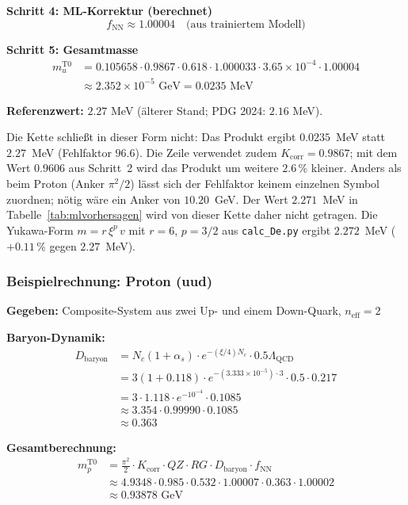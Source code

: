 	\textbf{Schritt 4: ML-Korrektur (berechnet)}
	\begin{equation}
		f_{\text{NN}} \approx 1.00004 \quad \text{(aus trainiertem Modell)}
	\end{equation}
	
	\textbf{Schritt 5: Gesamtmasse}
	\begin{align}
		m_u^{\text{T0}} &= 0.105658 \cdot 0.9867 \cdot 0.618 \cdot 1.000033 \cdot 3.65 \times 10^{-4} \cdot 1.00004 \\
				&\approx 2.352 \times 10^{-5} \text{ GeV} = 0.0235 \text{ MeV}
	\end{align}

	\textbf{Referenzwert:} $2.27$ MeV (älterer Stand; PDG 2024: $2.16$ MeV).

	Die Kette schließt in dieser Form nicht: Das Produkt ergibt $0.0235$~MeV statt $2.27$~MeV (Fehlfaktor $96.6$). Die Zeile verwendet zudem $K_{\text{corr}} = 0.9867$; mit dem Wert $0.9606$ aus Schritt~2 wird das Produkt um weitere $2.6\,\%$ kleiner. Anders als beim Proton (Anker $\pi^2/2$) lässt sich der Fehlfaktor keinem einzelnen Symbol zuordnen; nötig wäre ein Anker von $10.20$~GeV. Der Wert $2.271$~MeV in Tabelle~\ref{tab:mlvorhersagen} wird von dieser Kette daher nicht getragen. Die Yukawa-Form $m = r\,\xi^p\,v$ mit $r = 6$, $p = 3/2$ aus \texttt{calc\_De.py} ergibt $2.272$~MeV ($+0.11\,\%$ gegen $2.27$~MeV).
	
	\subsubsection{Beispielrechnung: Proton (uud)}
	
	\textbf{Gegeben:} Composite-System aus zwei Up- und einem Down-Quark, $n_{\text{eff}}=2$
	
	\textbf{Baryon-Dynamik:}
	\begin{align}
		D_{\text{baryon}} &= N_c (1 + \alpha_s) \cdot e^{-(\xi/4) N_c} \cdot 0.5 \Lambda_{\text{QCD}} \\
		&= 3 (1 + 0.118) \cdot e^{-(3.333 \times 10^{-5}) \cdot 3} \cdot 0.5 \cdot 0.217 \\
		&= 3 \cdot 1.118 \cdot e^{-10^{-4}} \cdot 0.1085 \\
		&\approx 3.354 \cdot 0.99990 \cdot 0.1085 \\
		&\approx 0.363
	\end{align}
	
	\textbf{Gesamtberechnung:}
	\begin{align}
		m_p^{\text{T0}} &= \frac{\pi^2}{2} \cdot K_{\text{corr}} \cdot QZ \cdot RG \cdot D_{\text{baryon}} \cdot f_{\text{NN}} \\
		&\approx 4.9348 \cdot 0.985 \cdot 0.532 \cdot 1.00007 \cdot 0.363 \cdot 1.00002 \\
		&\approx 0.93878 \text{ GeV}
	\end{align}
	
